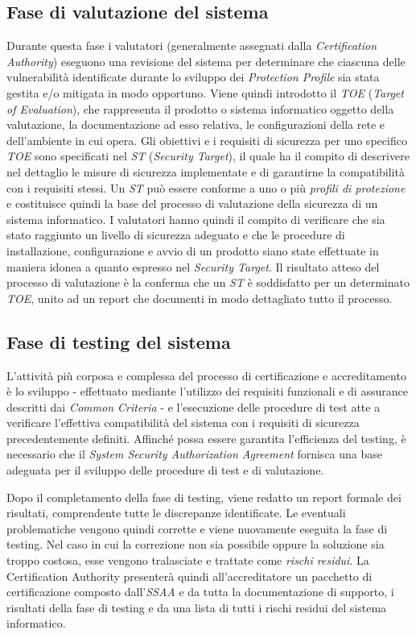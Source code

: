 \documentclass[../main.tex]{subfiles}
\begin{document}
\subsection{Fase di valutazione del sistema}
Durante questa fase i valutatori (generalmente assegnati dalla \textit{Certification Authority}) eseguono una revisione del sistema per determinare che ciascuna delle vulnerabilità identificate durante lo sviluppo dei \textit{Protection Profile} sia stata gestita e/o mitigata in modo opportuno.
Viene quindi introdotto il \textit{TOE} (\textit{Target of Evaluation}), che rappresenta il prodotto o sistema informatico oggetto della valutazione, la documentazione ad esso relativa, le configurazioni della rete e dell'ambiente in cui opera.
Gli obiettivi e i requisiti di sicurezza per uno specifico \textit{TOE} sono specificati nel \textit{ST} (\textit{Security Target}), il quale ha il compito di descrivere nel dettaglio le misure di sicurezza implementate e di garantirne la compatibilità con i requisiti stessi.
Un \textit{ST} può essere conforme a uno o più \textit{profili di protezione} e costituisce quindi la base del processo di valutazione della sicurezza di un sistema informatico.
I valutatori hanno quindi il compito di verificare che sia stato raggiunto un livello di sicurezza adeguato e che le procedure di installazione, configurazione e avvio di un prodotto siano state effettuate in maniera idonea a quanto espresso nel \textit{Security Target}.
Il risultato atteso del processo di valutazione è la conferma che un \textit{ST} è soddisfatto per un determinato \textit{TOE}, unito ad un report che documenti in modo dettagliato tutto il processo.

\subsection{Fase di testing del sistema}
L'attività più corposa e complessa del processo di certificazione e accreditamento è lo sviluppo - effettuato mediante l'utilizzo dei requisiti funzionali e di assurance descritti dai \textit{Common Criteria} - e l'esecuzione delle procedure di test atte a verificare l'effettiva compatibilità del sistema con i requisiti di sicurezza precedentemente definiti.
Affinché possa essere garantita l'efficienza del testing, è necessario che il \textit{System Security Authorization Agreement} fornisca una base adeguata per il sviluppo delle procedure di test e di valutazione.

Dopo il completamento della fase di testing, viene redatto un report formale dei risultati, comprendente tutte le discrepanze identificate.
Le eventuali problematiche vengono quindi corrette e viene nuovamente eseguita la fase di testing. Nel caso in cui la correzione non sia possibile oppure la soluzione sia troppo costosa, esse vengono tralasciate e trattate come \textit{rischi residui}.
La Certification Authority presenterà quindi all'accreditatore un pacchetto di certificazione composto dall'\textit{SSAA} e da tutta la documentazione di supporto, i risultati della fase di testing e da una lista di tutti i rischi residui del sistema informatico. 
\end{document}
